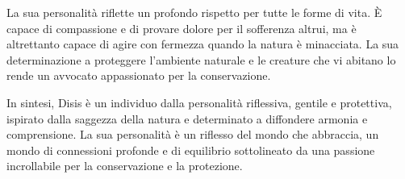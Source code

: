 La sua personalità riflette un profondo rispetto per tutte le forme di
vita. È capace di compassione e di provare dolore per il sofferenza
altrui, ma è altrettanto capace di agire con fermezza quando la natura è
minacciata. La sua determinazione a proteggere l'ambiente naturale e le
creature che vi abitano lo rende un avvocato appassionato per la
conservazione.

In sintesi, Disis è un individuo dalla personalità riflessiva, gentile e
protettiva, ispirato dalla saggezza della natura e determinato a
diffondere armonia e comprensione. La sua personalità è un riflesso del
mondo che abbraccia, un mondo di connessioni profonde e di equilibrio
sottolineato da una passione incrollabile per la conservazione e la
protezione.

